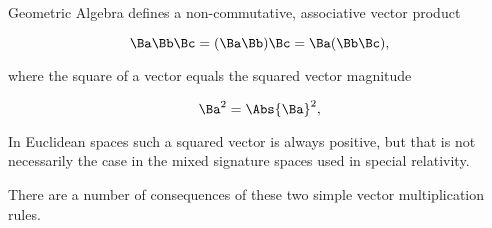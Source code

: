 %
%

Geometric Algebra defines a non-commutative, associative vector product

\begin{equation}\label{eqn:gaTutorial:20}
\Ba \Bb \Bc
=
(\Ba \Bb) \Bc
=
\Ba (\Bb \Bc),
\end{equation}

where the square of a vector equals the squared vector magnitude

\begin{dmath}\label{eqn:gaTutorial:40}
\Ba^2 = \Abs{\Ba}^2,
\end{dmath}

In Euclidean spaces such a squared vector is always positive, but that is not necessarily the case in the mixed signature spaces used in special relativity.

There are a number of consequences of these two simple vector multiplication rules.

